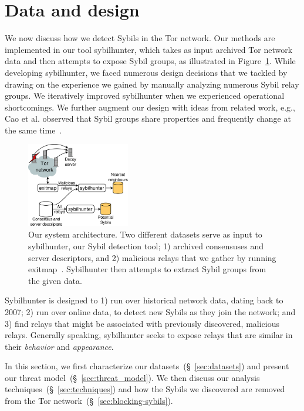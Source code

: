 \section{Data and design}
\label{sec:design}
We now discuss how we detect Sybils in the Tor network.  Our methods are
implemented in our tool sybilhunter, which takes as input archived Tor network
data and then attempts to expose Sybil groups, as illustrated in
Figure~\ref{fig:system}.  While developing sybilhunter, we faced numerous design
decisions that we tackled by drawing on the experience we gained by manually
analyzing numerous Sybil relay groups.  We iteratively improved sybilhunter when
we experienced operational shortcomings.  We further augment our design with
ideas from related work, e.g., Cao et al. observed that Sybil groups share
properties and frequently change at the same time~\cite{Cao2014a}.

\begin{figure}[t]
	\centering
	\includegraphics[width=0.4\textwidth]{diagrams/system_architecture.pdf}
	\caption{Our system architecture.  Two different datasets serve as input
		to sybilhunter, our Sybil detection tool; 1) archived consensuses and
		server descriptors, and 2) malicious relays that we gather by running
		exitmap~\cite{Winter2014a}.  Sybilhunter then attempts to extract Sybil
		groups from the given data.}
	\label{fig:system}
\end{figure}

Sybilhunter is designed to 1) run over historical network data, dating back to
2007; 2) run over online data, to detect new Sybils as they join the network;
and 3) find relays that might be associated with previously discovered,
malicious relays.  Generally speaking, sybilhunter seeks to expose relays that
are similar in their \emph{behavior} and \emph{appearance}.

In this section, we first characterize our datasets~(\S~\ref{sec:datasets}) and
present our threat model~(\S~\ref{sec:threat_model}).  We then discuss our
analysis techniques~(\S~\ref{sec:techniques}) and how the Sybils we
discovered are removed from the Tor network~(\S~\ref{sec:blocking-sybils}).

